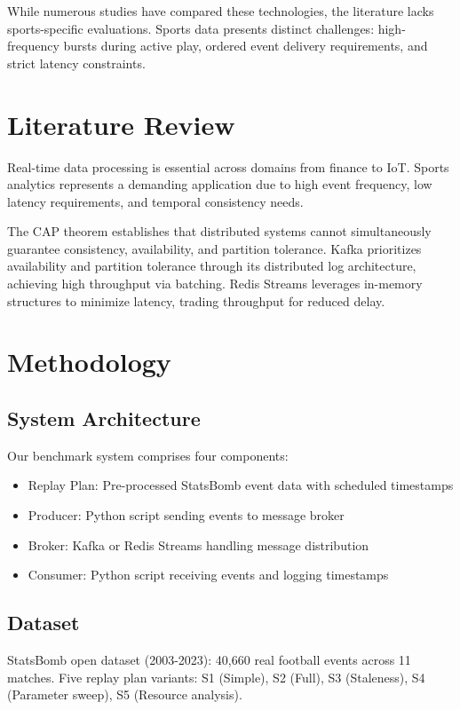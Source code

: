 \documentclass[10pt,a4paper]{article}
\begin{document}
While numerous studies have compared these technologies, the literature lacks sports-specific evaluations. Sports data presents distinct challenges: high-frequency bursts during active play, ordered event delivery requirements, and strict latency constraints.

\section{Literature Review}
\label{sec:literature}
Real-time data processing is essential across domains from finance to IoT. Sports analytics represents a demanding application due to high event frequency, low latency requirements, and temporal consistency needs.

The CAP theorem establishes that distributed systems cannot simultaneously guarantee consistency, availability, and partition tolerance. Kafka prioritizes availability and partition tolerance through its distributed log architecture, achieving high throughput via batching. Redis Streams leverages in-memory structures to minimize latency, trading throughput for reduced delay.

\section{Methodology}
\label{sec:methodology}
\subsection{System Architecture}
Our benchmark system comprises four components:
\begin{itemize}
\item Replay Plan: Pre-processed StatsBomb event data with scheduled timestamps
\item Producer: Python script sending events to message broker
\item Broker: Kafka or Redis Streams handling message distribution
\item Consumer: Python script receiving events and logging timestamps
\end{itemize}

\subsection{Dataset}
StatsBomb open dataset (2003-2023): 40,660 real football events across 11 matches. Five replay plan variants: S1 (Simple), S2 (Full), S3 (Staleness), S4 (Parameter sweep), S5 (Resource analysis).
\end{document}
